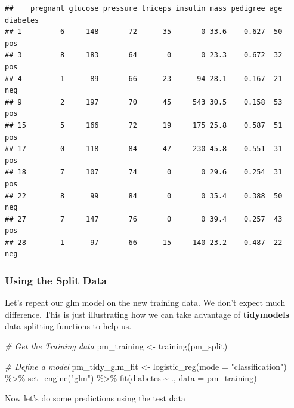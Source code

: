 \documentclass[
]{article}
\newenvironment{Shaded}{\begin{snugshade}}{\end{snugshade}}
\newcommand{\AttributeTok}[1]{\textcolor[rgb]{0.77,0.63,0.00}{#1}}
\newcommand{\CommentTok}[1]{\textcolor[rgb]{0.56,0.35,0.01}{\textit{#1}}}
\newcommand{\FunctionTok}[1]{\textcolor[rgb]{0.00,0.00,0.00}{#1}}
\newcommand{\NormalTok}[1]{#1}
\newcommand{\OtherTok}[1]{\textcolor[rgb]{0.56,0.35,0.01}{#1}}
\newcommand{\SpecialCharTok}[1]{\textcolor[rgb]{0.00,0.00,0.00}{#1}}
\newcommand{\StringTok}[1]{\textcolor[rgb]{0.31,0.60,0.02}{#1}}
\begin{document}
\begin{verbatim}
##    pregnant glucose pressure triceps insulin mass pedigree age diabetes
## 1         6     148       72      35       0 33.6    0.627  50      pos
## 3         8     183       64       0       0 23.3    0.672  32      pos
## 4         1      89       66      23      94 28.1    0.167  21      neg
## 9         2     197       70      45     543 30.5    0.158  53      pos
## 15        5     166       72      19     175 25.8    0.587  51      pos
## 17        0     118       84      47     230 45.8    0.551  31      pos
## 18        7     107       74       0       0 29.6    0.254  31      pos
## 22        8      99       84       0       0 35.4    0.388  50      neg
## 27        7     147       76       0       0 39.4    0.257  43      pos
## 28        1      97       66      15     140 23.2    0.487  22      neg
\end{verbatim}

\hypertarget{using-the-split-data}{%
\subsubsection{Using the Split Data}\label{using-the-split-data}}

Let's repeat our glm model on the new training data. We don't expect
much difference. This is just illustrating how we can take advantage of
\textbf{tidymodels} data splitting functions to help us.

\begin{Shaded}
\begin{Highlighting}[]
\CommentTok{\# Get the Training data}
\NormalTok{pm\_training }\OtherTok{\textless{}{-}} \FunctionTok{training}\NormalTok{(pm\_split)}

\CommentTok{\# Define a model}
\NormalTok{pm\_tidy\_glm\_fit }\OtherTok{\textless{}{-}} \FunctionTok{logistic\_reg}\NormalTok{(}\AttributeTok{mode =} \StringTok{"classification"}\NormalTok{) }\SpecialCharTok{\%\textgreater{}\%}
  \FunctionTok{set\_engine}\NormalTok{(}\StringTok{"glm"}\NormalTok{) }\SpecialCharTok{\%\textgreater{}\%}
  \FunctionTok{fit}\NormalTok{(diabetes }\SpecialCharTok{\textasciitilde{}}\NormalTok{ ., }\AttributeTok{data =}\NormalTok{ pm\_training)}
\end{Highlighting}
\end{Shaded}

Now let's do some predictions using the test data
\end{document}
